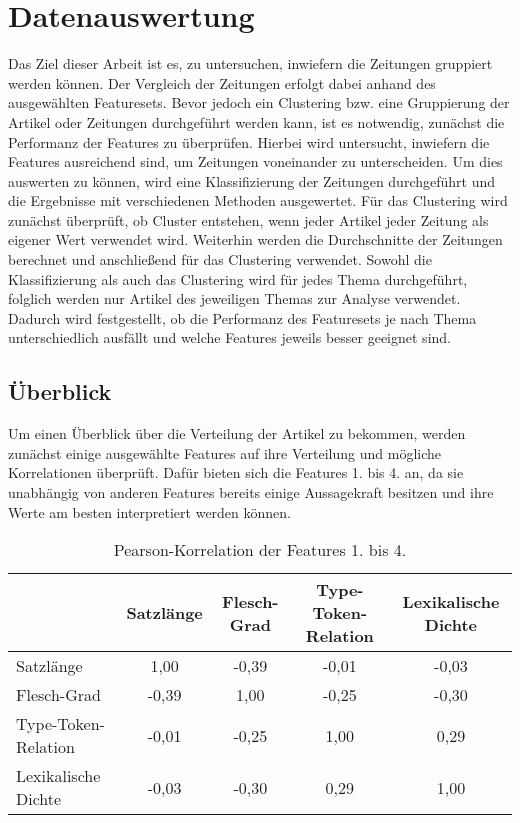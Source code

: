 \chapter{Datenauswertung}
Das Ziel dieser Arbeit ist es, zu untersuchen, inwiefern die Zeitungen gruppiert werden können. Der Vergleich der Zeitungen erfolgt dabei anhand des ausgewählten Featuresets. Bevor jedoch ein Clustering bzw. eine Gruppierung der Artikel oder Zeitungen durchgeführt werden kann, ist es notwendig, zunächst die Performanz der Features zu überprüfen. Hierbei wird untersucht, inwiefern die Features ausreichend sind, um Zeitungen voneinander zu unterscheiden. Um dies auswerten zu können, wird eine Klassifizierung der Zeitungen durchgeführt und die Ergebnisse mit verschiedenen Methoden ausgewertet. Für das Clustering wird zunächst überprüft, ob Cluster entstehen, wenn jeder Artikel jeder Zeitung als eigener Wert verwendet wird. Weiterhin werden die Durchschnitte der Zeitungen berechnet und anschließend für das Clustering verwendet. Sowohl die Klassifizierung als auch das Clustering wird für jedes Thema durchgeführt, folglich werden nur Artikel des jeweiligen Themas zur Analyse verwendet. Dadurch wird festgestellt, ob die Performanz des Featuresets je nach Thema unterschiedlich ausfällt und welche Features jeweils besser geeignet sind.

\section{Überblick}
Um einen Überblick über die Verteilung der Artikel zu bekommen, werden zunächst einige ausgewählte Features auf ihre Verteilung und mögliche Korrelationen überprüft. Dafür bieten sich die Features 1. bis 4. an, da sie unabhängig von anderen Features bereits einige Aussagekraft besitzen und ihre Werte am besten interpretiert werden können.

\begin{table}
\centering
\begin{spacing}{1.25}
\begin{tabular}[t]{lcccc}
\toprule
~ & Satzlänge & Flesch-Grad & Type-Token-Relation & Lexikalische Dichte\\
\midrule
Satzlänge & 1,00 & -0,39 & -0,01 & -0,03\\
Flesch-Grad & -0,39 & 1,00 & -0,25 & -0,30\\
Type-Token-Relation & -0,01 & -0,25 & 1,00 & 0,29\\
Lexikalische Dichte & -0,03 & -0,30 & 0,29 & 1,00\\
\bottomrule
\end{tabular}
\caption{Pearson-Korrelation der Features 1. bis 4.}
\label{correlation}
\end{spacing}
\end{table}


